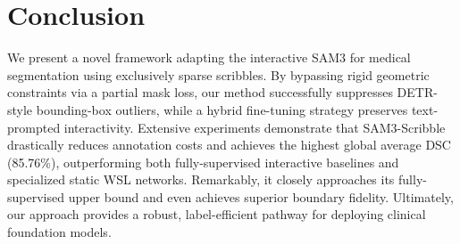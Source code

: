 \documentclass[runningheads]{llncs}
\begin{document}
\section{Conclusion}
We present a novel framework adapting the interactive SAM3 for medical segmentation using exclusively sparse scribbles. By bypassing rigid geometric constraints via a partial mask loss, our method successfully suppresses DETR-style bounding-box outliers, while a hybrid fine-tuning strategy preserves text-prompted interactivity. Extensive experiments demonstrate that SAM3-Scribble drastically reduces annotation costs and achieves the highest global average DSC (85.76\%), outperforming both fully-supervised interactive baselines and specialized static WSL networks. Remarkably, it closely approaches its fully-supervised upper bound and even achieves superior boundary fidelity. Ultimately, our approach provides a robust, label-efficient pathway for deploying clinical foundation models.

%
%

    




%
%
%


\end{document}
